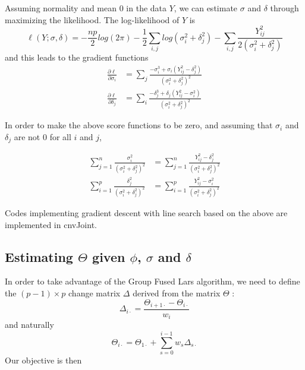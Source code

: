 \documentclass[11pt]{article}
\begin{document}
Assuming normality and mean 0 in the data $Y$, we can estimate $\sigma$ and $\delta$ through maximizing the likelihood. The log-likelihood of $Y$ is
\begin{equation}
\ell(Y; \sigma, \delta) = -\frac{np}{2}log(2\pi)
-\frac{1}{2} \sum_{i,j} log(\sigma_i^2 + \delta_j^2) - \sum_{i,j} \frac{Y_{ij}^2}{2(\sigma_i^2 + \delta_j^2)}
\end{equation}
\noindent and this leads to the gradient functions
\begin{align}
\frac{\partial \ell}{\partial \sigma_i} &= \sum_j 
\frac{ -\sigma_i^3 + \sigma_i (Y_{ij}^2 - \delta_j^2)}{(\sigma_i^2 + \delta_j^2)^2}\\
\frac{\partial \ell} {\partial \delta_j} &= \sum_i
\frac{-\delta_j^3 + \delta_j (Y_{ij}^2 - \sigma_i^2)}{(\sigma_i^2 + \delta_j^2)^2}
\end{align}

\noindent In order to make the above score functions to be zero, and assuming that $\sigma_i$ and $\delta_j$ are not 0 for all $i$ and $j$,

\begin{align}
\sum_{j=1}^{n} \frac{\sigma_i^2}{(\sigma_i^2 + \delta_j^2)^2} &= \sum_{j=1}^{n} \frac{Y_{ij}^2 - \delta_j^2}{(\sigma_i^2 + \delta_j^2)^2}\\
\sum_{i=1}^{p} \frac{\delta_j^2}{(\sigma_i^2 + \delta_j^2)^2} &= \sum_{i=1}^{p} \frac{Y_{ij}^2 - \sigma_i^2}{(\sigma_i^2 + \delta_j^2)^2}
\end{align}

\noindent Codes implementing gradient descent with line search based on the above are implemented in cnvJoint.


\subsection*{Estimating $\Theta$ given $\phi$, $\sigma$ and $\delta$}

In order to take advantage of the Group Fused Lars algorithm, we need to define the $(p-1) \times p$ change matrix $\Delta$ derived from the matrix $\Theta$ :
\begin{equation}
\Delta_{i \cdot} = \frac{\Theta_{i+1 \cdot}-\Theta_{i \cdot}}{w_i}
\end{equation}
\noindent and naturally
\begin{equation}
\Theta_{i\cdot} = \Theta_{1\cdot} + \sum_{s=0}^{i-1} w_s \Delta_{s \cdot}
\end{equation}
Our objective is then
\end{document}
